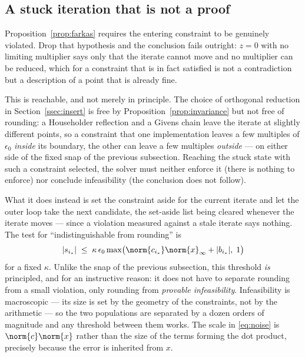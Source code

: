 \subsection{A stuck iteration that is not a proof}

Proposition~\ref{prop:farkas} requires the entering constraint to be genuinely
violated. Drop that hypothesis and the conclusion fails outright: $z = 0$ with no
limiting multiplier says only that the iterate cannot move and no multiplier can
be reduced, which for a constraint that is in fact satisfied is not a
contradiction but a description of a point that is already fine.

This is reachable, and not merely in principle. The choice of orthogonal reduction
in Section~\ref{ssec:insert} is free by Proposition~\ref{prop:invariance} but not
free of rounding: a Householder reflection and a Givens chain leave the iterate at
slightly different points, so a constraint that one implementation leaves a few
multiples of $\epsilon_0$ \emph{inside} its boundary, the other can leave a few
multiples \emph{outside} --- on either side of the fixed snap of the previous
subsection. Reaching the stuck state with such a constraint selected, the solver
must neither enforce it (there is nothing to enforce) nor conclude infeasibility
(the conclusion does not follow).

What it does instead is set the constraint aside for the current iterate and let
the outer loop take the next candidate, the set-aside list being cleared whenever
the iterate moves --- since a violation measured against a stale iterate says
nothing. The test for ``indistinguishable from rounding'' is
\begin{equation}
  |s_{i_*}| \;\le\; \kappa\, \epsilon_0 \max\bigl(
    \norm{c_{i_*}} \norm{x}_\infty + |b_{i_*}|,\; 1 \bigr)
  \label{eq:noise}
\end{equation}
for a fixed $\kappa$. Unlike the snap of the previous subsection, this threshold
\emph{is} principled, and for an instructive reason: it does not have to separate
rounding from a small violation, only rounding from \emph{provable
infeasibility}. Infeasibility is macroscopic --- its size is set by the geometry of
the constraints, not by the arithmetic --- so the two populations are separated by
a dozen orders of magnitude and any threshold between them works. The scale in
\eqref{eq:noise} is $\norm{c}\norm{x}$ rather than the size of the terms forming
the dot product, precisely because the error is inherited from $x$.

